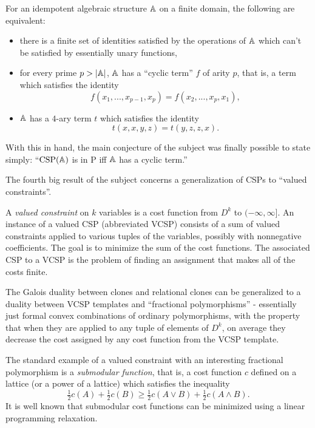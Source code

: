 \documentclass[letterpaper,11pt]{article}
\DeclareMathOperator{\CSP}{CSP}
\begin{document}
\begin{thm} For an idempotent algebraic structure $\mathbb{A}$ on a finite domain, the following are equivalent:
\begin{itemize}
\item there is a finite set of identities satisfied by the operations of $\mathbb{A}$ which can't be satisfied by essentially unary functions,

\item for every prime $p > |\mathbb{A}|$, $\mathbb{A}$ has a ``cyclic term'' $f$ of arity $p$, that is, a term which satisfies the identity
\[
f(x_1, ..., x_{p-1}, x_p) = f(x_2, ..., x_p, x_1),
\]

\item $\mathbb{A}$ has a $4$-ary term $t$ which satisfies the identity
\[
t(x,x,y,z) = t(y,z,z,x).
\]
\end{itemize}
\end{thm}

With this in hand, the main conjecture of the subject was finally possible to state simply: ``$\CSP(\bA)$ is in P iff $\mathbb{A}$ has a cyclic term.''

The fourth big result of the subject concerns a generalization of CSPs to ``valued constraints''.

\begin{defn} A \emph{valued constraint} on $k$ variables is a cost function from $D^k$ to $(-\infty, \infty]$. An instance of a valued CSP (abbreviated VCSP) consists of a sum of valued constraints applied to various tuples of the variables, possibly with nonnegative coefficients. The goal is to minimize the sum of the cost functions. The associated CSP to a VCSP is the problem of finding an assignment that makes all of the costs finite.
\end{defn}

The Galois duality between clones and relational clones can be generalized to a duality between VCSP templates and ``fractional polymorphisms'' - essentially just formal convex combinations of ordinary polymorphisms, with the property that when they are applied to any tuple of elements of $D^k$, on average they decrease the cost assigned by any cost function from the VCSP template.

The standard example of a valued constraint with an interesting fractional polymorphism is a \emph{submodular function}, that is, a cost function $c$ defined on a lattice (or a power of a lattice) which satisfies the inequality
\[
\tfrac{1}{2}c(A) + \tfrac{1}{2}c(B) \ge \tfrac{1}{2}c(A\vee B) + \tfrac{1}{2}c(A\wedge B).
\]
It is well known that submodular cost functions can be minimized using a linear programming relaxation.
\end{document}
